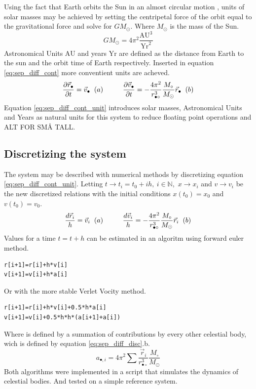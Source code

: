 \documentclass[twoside,twocolumn]{article}
\newcommand{\sun}{\odot}
\newcommand{\planet}{\bullet}
\newcommand{\AU}{\text{AU}}
\newcommand{\Yr}{\text{Yr}}
\begin{document}
Using the fact that Earth orbits the Sun in an almost circular motion \citep{NASA:orbit}, units of solar masses may be achieved by setting the centripetal force of the orbit equal to the gravitational force and solve for $GM_\sun$. Where $M_\sun$ is the mass of the Sun.
\begin{equation}
GM_\sun = 4\pi^2 \frac{\AU^3}{\Yr^2} \label{eq:units}
\end{equation}
Astronomical Units $\AU$ and years $\Yr$ are defined as the distance from Earth to the sun and the orbit time of Earth respectively. Inserted in equation \ref{eq:sep_diff_cont} more conventient units are acheved.
\begin{equation}
\frac{\partial \vec r_\planet}{\partial t} = \vec v_\planet\hspace{0.2cm}(a)\hspace{1cm}
\frac{\partial \vec v_\planet}{\partial t} =-\frac{4\pi^2 }{r_{\planet\circ
}^3}\frac{M_\circ}{M_\sun} \vec r_\planet\hspace{0.2cm}(b)\label{eq:sep_diff_cont_unit}
\end{equation}
Equation \ref{eq:sep_diff_cont_unit} introduces solar masses, Astronomical Units and Years as natural units for this system to reduce floating point operations and ALT FOR SMÅ TALL. 

\subsection{Discretizing the system}
The system may be described with numerical methods by discretizing equation \ref{eq:sep_diff_cont_unit}. Letting  $t\rightarrow t_i=t_0+ih,\ i\in \mathbb{N}$,\ $x\rightarrow x_i$ and $v\rightarrow v_i$ be the new discretized relations with the initial conditions $x(t_0)=x_0$ and $v(t_0)=v_0$. 
\begin{equation}
\frac{d \vec r_i}{h} = \vec v_i\hspace{0.2cm}(a)\hspace{1cm}
\frac{d \vec v_i}{h} =-\frac{4\pi^2}{r_{\planet\circ
}^3}\frac{M_\circ}{M_\sun}\vec r_i\hspace{0.2cm}(b)\label{eq:sep_diff_disc}
\end{equation}
Values for a time $t=t+h$ can be estimated in an algoritm using forward euler method.
\begin{lstlisting}[style=customc]
r[i+1]=r[i]+h*v[i]
v[i+1]=v[i]+h*a[i]
\end{lstlisting}
Or with the more stable Verlet Vocity method.
\begin{lstlisting}[style=customc]
r[i+1]=r[i]+h*v[i]+0.5*h*a[i]
v[i+1]=v[i]+0.5*h*h*(a[i+1]+a[i])
\end{lstlisting}
Where is defined by a summation of contributions by every other celestial body, wich is defined by equation \ref{eq:sep_diff_disc}.b. 
\begin{equation}
a_{\planet,i} = 4\pi^2\sum \frac{\vec r_i}{r_{\planet\circ
}^3}\frac{M_\circ}{M_\sun}\label{eq:acc}
\end{equation}
Both algorithms were implemented in a script that simulates the dynamics of celestial bodies. And tested on a simple reference system. 
\end{document}
